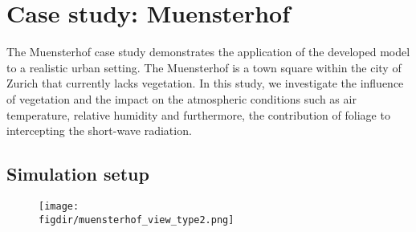 



 


\section{Case study: Muensterhof}

The Muensterhof case study demonstrates the application of the developed model to a realistic urban setting. The Muensterhof is a town square within the city of Zurich that currently lacks vegetation. In this study, we investigate the influence of vegetation and the impact on the atmospheric conditions such as air temperature, relative humidity and furthermore, the contribution of foliage to intercepting the short-wave radiation. 

\subsection{Simulation setup}
\label{sec:muenstersetup}

\begin{figure}[t]
	\centering
	\texttt{[image: \\figdir/muensterhof\_view\_type2.png]}
	\caption{}
	\label{fig:muensterhof_view}
\end{figure}

